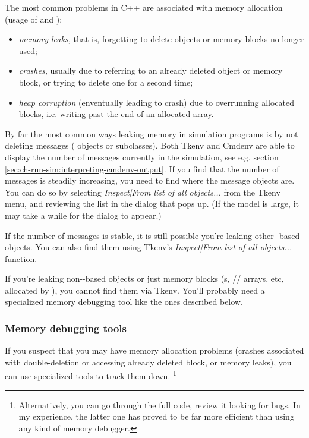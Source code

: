 The most common problems in C++ are associated with memory allocation
(usage of  and ):

\begin{itemize}
   \item{\textit{memory leaks,} that is, forgetting to delete objects
     or memory blocks no longer used;}
   \item{\textit{crashes,} usually due to referring to an already deleted
     object or memory block, or trying to delete one for a second time;}
   \item{\textit{heap corruption} (enventually leading to crash) due to
     overrunning allocated blocks, i.e. writing past the end of an allocated
     array.}
\end{itemize}

By far the most common ways leaking memory in simulation programs
is by not deleting messages ( objects or subclasses).
Both Tkenv and Cmdenv are able to display the number of messages
currently in the simulation,
see e.g. section \ref{sec:ch-run-sim:interpreting-cmdenv-output}.
If you find that the number of messages is steadily increasing,
you need to find where the message objects are. You can do so
by selecting \textit{Inspect|From list of all objects...} from
the Tkenv menu, and reviewing the list in the dialog that pops up.
(If the model is large, it may take a while for the dialog to appear.)

If the number of messages is stable, it is still possible
you're leaking other -based objects. You can
also find them using Tkenv's \textit{Inspect|From list of all objects...}
function.

If you're leaking non--based objects or just
memory blocks (s, // arrays,
etc, allocated by ), you cannot find them via Tkenv.
You'll probably need a specialized memory debugging tool like
the ones described below.

\subsubsection{Memory debugging tools}

If you suspect that you may have memory allocation problems
(crashes associated with double-deletion or accessing already
deleted block, or memory leaks), you can use specialized tools
to track them down.
  \footnote{Alternatively, you can go through the full code,
  review it looking for bugs. In my experience, the latter one
  has proved to be far more efficient than using any kind
  of memory debugger.}

